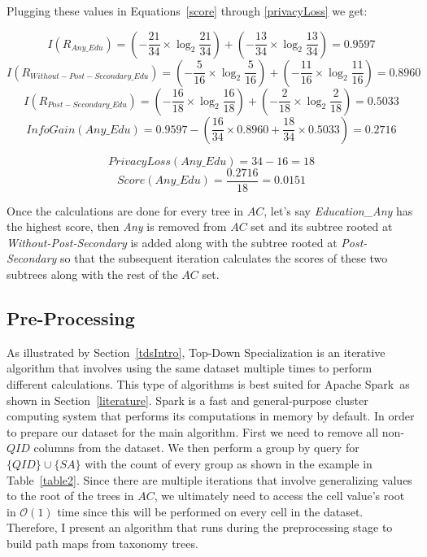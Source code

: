 \documentclass[11pt]{article}       %
\begin{document}
Plugging these values in Equations~\ref{score} through \ref{privacyLoss} we get:

\[I (R_{Any\_Edu}) = (- \frac{21}{34} \times \log_2 \frac{21}{34}) + (- \frac{13}{34} \times \log_2 \frac{13}{34}) = 0.9597\]
\[I (R_{Without-Post-Secondary\_Edu}) = (- \frac{5}{16} \times \log_2 \frac{5}{16}) + (- \frac{11}{16} \times \log_2 \frac{11}{16}) = 0.8960 \]
\[ I (R_{Post-Secondary\_Edu}) = (- \frac{16}{18} \times \log_2 \frac{16}{18}) + (- \frac{2}{18} \times \log_2 \frac{2}{18}) = 0.5033 \]
\[ InfoGain(Any\_Edu) = 0.9597 - (\frac{16}{34} \times 0.8960 + \frac{18}{34} \times 0.5033) = 0.2716 \]

\[ PrivacyLoss(Any\_Edu) = 34 - 16 = 18 \]
\[ Score(Any\_Edu) = \frac{0.2716}{18} = 0.0151 \]

Once the calculations are done for every tree in $AC$, let's say \emph{Education\_Any} has the highest score, then \emph{Any} is removed from $AC$ set and its subtree rooted at \emph{Without-Post-Secondary} is added along with the subtree rooted at \emph{Post-Secondary} so that the subsequent iteration calculates the scores of these two subtrees along with the rest of the $AC$ set.

\subsection{Pre-Processing}

As illustrated by Section~\ref{tdsIntro}, Top-Down Specialization is an iterative algorithm that involves using the same dataset multiple times to perform different calculations. This type of algorithms is best suited for Apache Spark\texttrademark~as shown in Section~\ref{literature}. Spark is a fast and general-purpose cluster computing system that performs its computations in memory by default. In order to prepare our dataset for the main algorithm. First we need to remove all non-$QID$ columns from the dataset. We then perform a group by query for \( \{QID\} \cup \{SA\} \) with the count of every group as shown in the example in Table~\ref{table2}. Since there are multiple iterations that involve generalizing values to the root of the trees in $AC$, we ultimately need to access the cell value's root in \(\mathcal{O}(1)\) time since this will be performed on every cell in the dataset. Therefore, I present an algorithm that runs during the preprocessing stage to build path maps from taxonomy trees.
\end{document}

